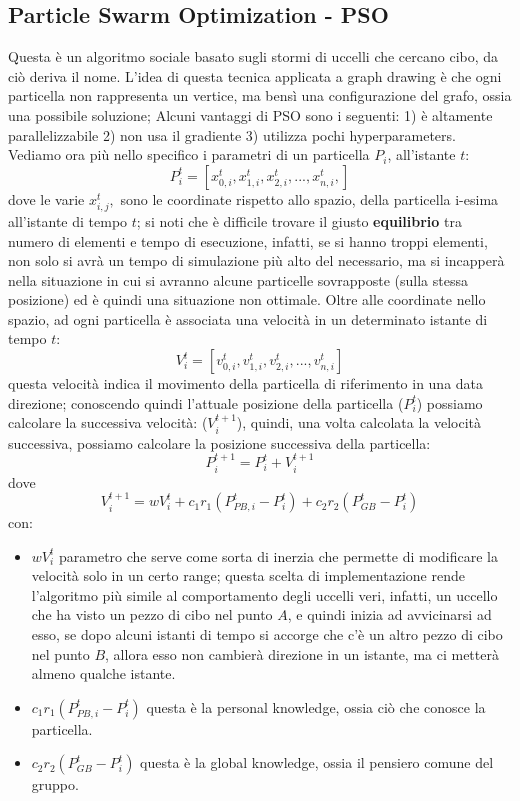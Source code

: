 \documentclass[12pt,a4paper]{article}
\begin{document}
\subsection{Particle Swarm Optimization - PSO}
Questa è un algoritmo sociale basato sugli stormi di uccelli che cercano cibo, da ciò deriva il nome. L'idea di questa tecnica applicata a graph drawing è che ogni particella non rappresenta un vertice, ma bensì una configurazione del grafo, ossia una possibile soluzione; Alcuni vantaggi di PSO sono i seguenti: 1) è altamente parallelizzabile 2) non usa il gradiente 3) utilizza pochi hyperparameters. Vediamo ora più nello specifico i parametri di un particella $P_i$, all'istante $t$:
$$P_i^{t} = [ x_{0, i}^{t}, x_{1, i}^{t}, x_{2, i}^{t}, ... ,x_{n, i}^{t},] $$
dove le varie $x_{i, j}^{t},$ sono le coordinate rispetto allo spazio, della particella i-esima all'istante di tempo $t$; si noti che è difficile trovare il giusto \textbf{equilibrio} tra numero di elementi e tempo di esecuzione, infatti, se si hanno troppi elementi, non solo si avrà un tempo di simulazione più alto del necessario, ma si incapperà nella situazione in cui si avranno alcune particelle sovrapposte (sulla stessa posizione) ed è quindi una situazione non ottimale. Oltre alle coordinate nello spazio, ad ogni particella è associata una velocità in un determinato istante di tempo $t$:
$$ V_{i}^{t} = [v_{0,i}^{t}, v_{1,i}^{t}, v_{2,i}^{t}, ... , v_{n,i}^{t}] $$
questa velocità indica il movimento della particella di riferimento in una data direzione; conoscendo quindi l'attuale posizione della particella ($P_i^{t}$) possiamo calcolare la successiva velocità: ($V_{i}^{t+1}$), quindi, una volta calcolata la velocità successiva, possiamo calcolare la posizione successiva della particella:
$$ P_{i}^{t+1} =  P_{i}^{t} + V_{i}^{t+1}$$
dove
$$V_{i}^{t+1} = w V_{i}^{t} + c_1 r_1(P_{PB, i}^{t} - P_{i}^{t}) + c_2 r_2 (P_{GB}^{t} - P_{i}^{t})$$
con:
\begin{itemize}
\item $w V_{i}^{t}$ parametro che serve come sorta di inerzia che permette di modificare la velocità solo in un certo range; questa scelta di implementazione rende l'algoritmo più simile al comportamento degli uccelli veri, infatti, un uccello che ha visto un pezzo di cibo nel punto $A$, e quindi inizia ad avvicinarsi ad esso, se dopo alcuni istanti di tempo si accorge che c'è un altro pezzo di cibo nel punto $B$, allora esso non cambierà direzione in un istante, ma ci metterà almeno qualche istante.
\item $c_1 r_1(P_{PB, i}^{t} - P_{i}^{t})$ questa è la personal knowledge, ossia ciò che conosce la particella.
\item $c_2 r_2 (P_{GB}^{t} - P_{i}^{t})$ questa è la global knowledge, ossia il pensiero comune del gruppo.
\end{itemize}
\end{document}

